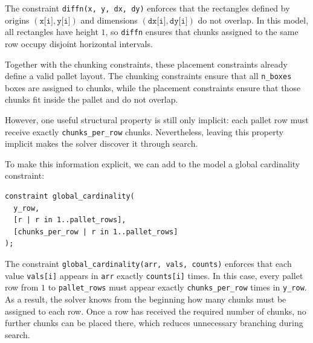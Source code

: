 The constraint \texttt{diffn(x, y, dx, dy)} enforces that the
rectangles defined by origins \((\texttt{x[i]}, \texttt{y[i]})\) and
dimensions \((\texttt{dx[i]}, \texttt{dy[i]})\) do not overlap. In this model, all
rectangles have height \(1\), so \texttt{diffn} ensures that chunks assigned to
the same row occupy disjoint horizontal intervals.

Together with the chunking constraints, these placement constraints already
define a valid pallet layout. The chunking constraints ensure that all
\texttt{n\_boxes} boxes are assigned to chunks, while the placement constraints
ensure that those chunks fit inside the pallet and do not overlap.

However, one useful structural property is still only implicit: each pallet row
must receive exactly \texttt{chunks\_per\_row} chunks. Nevertheless, leaving
this property implicit makes the solver discover it through search.

To make this information explicit, we can add to the model a global cardinality
constraint:

\vspace{0.5cm}
\begin{lstlisting}
constraint global_cardinality(
  y_row,
  [r | r in 1..pallet_rows],
  [chunks_per_row | r in 1..pallet_rows]
);
\end{lstlisting}
\vspace{0.5cm}

The constraint \texttt{global\_cardinality(arr, vals, counts)} enforces that
each value \texttt{vals[i]} appears in \texttt{arr} exactly
\texttt{counts[i]} times. In this case, every pallet row from \(1\) to
\texttt{pallet\_rows} must appear exactly \texttt{chunks\_per\_row} times
in \texttt{y\_row}. As a result, the solver knows from the beginning how many
chunks must be assigned to each row. Once a row has received the required number
of chunks, no further chunks can be placed there, which reduces unnecessary
branching during search.